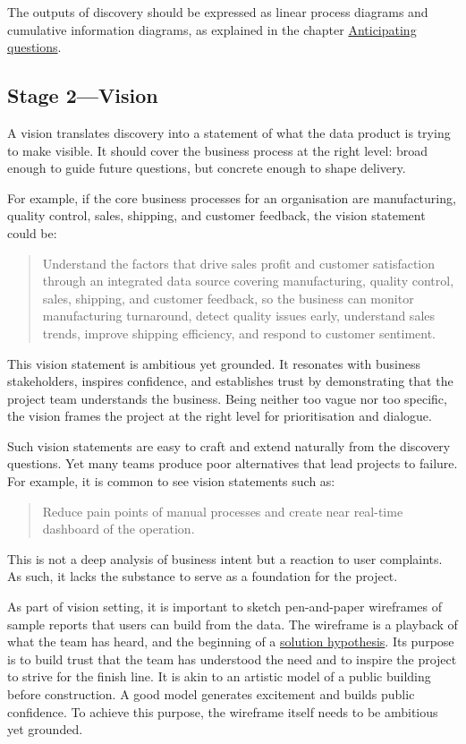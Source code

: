 \documentclass[10pt,openany,10pt]{book}
\begin{document}
The outputs of discovery should be expressed as linear process diagrams
and cumulative information diagrams, as explained in the chapter
\href{/docs/modelling-reality/anticipating-questions/}{Anticipating
questions}.

\subsection{Stage 2---Vision}\label{stage-2vision}

A vision translates discovery into a statement of what the data product
is trying to make visible. It should cover the business process at the
right level: broad enough to guide future questions, but concrete enough
to shape delivery.

For example, if the core business processes for an organisation are
manufacturing, quality control, sales, shipping, and customer feedback,
the vision statement could be:

\begin{quote}
Understand the factors that drive sales profit and customer satisfaction
through an integrated data source covering manufacturing, quality
control, sales, shipping, and customer feedback, so the business can
monitor manufacturing turnaround, detect quality issues early,
understand sales trends, improve shipping efficiency, and respond to
customer sentiment.
\end{quote}

This vision statement is ambitious yet grounded. It resonates with
business stakeholders, inspires confidence, and establishes trust by
demonstrating that the project team understands the business. Being
neither too vague nor too specific, the vision frames the project at the
right level for prioritisation and dialogue.

Such vision statements are easy to craft and extend naturally from the
discovery questions. Yet many teams produce poor alternatives that lead
projects to failure. For example, it is common to see vision statements
such as:

\begin{quote}
Reduce pain points of manual processes and create near real-time
dashboard of the operation.
\end{quote}

This is not a deep analysis of business intent but a reaction to user
complaints. As such, it lacks the substance to serve as a foundation for
the project.

As part of vision setting, it is important to sketch pen-and-paper
wireframes of sample reports that users can build from the data. The
wireframe is a playback of what the team has heard, and the beginning of
a
\hyperref[docs-judgement-under-ambiguity-working-with-stakeholders]{solution
hypothesis}. Its purpose is to build trust that the team has understood
the need and to inspire the project to strive for the finish line. It is
akin to an artistic model of a public building before construction. A
good model generates excitement and builds public confidence. To achieve
this purpose, the wireframe itself needs to be ambitious yet grounded.
\end{document}

